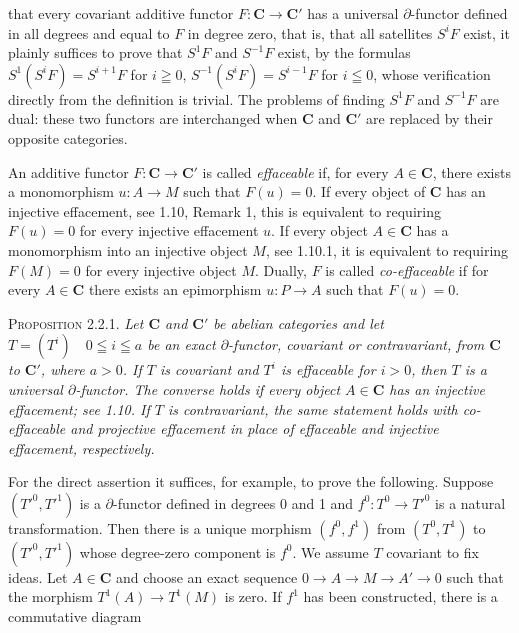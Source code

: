 
\noindent that every covariant additive functor $F:\mathbf{C}\to \mathbf{C}'$ has a
universal $\partial$-functor defined in all degrees and equal to $F$ in degree
zero, that is, that all satellites $S^iF$ exist, it plainly suffices to prove
that $S^1F$ and $S^{-1}F$ exist, by the formulas
$S^1(S^iF)=S^{i+1}F$ for $i\geqq0$, $S^{-1}(S^iF)=S^{i-1}F$ for $i\leqq0$,
whose verification directly from the definition is trivial. The
problems of finding $S^1F$ and $S^{-1}F$ are dual: these two functors are
interchanged when $\mathbf{C}$ and $\mathbf{C}'$ are replaced by their opposite categories.

An additive functor $F:\mathbf{C}\to \mathbf{C}'$ is called \textit{effaceable} if,
for every $A\in \mathbf{C}$, there exists a monomorphism $u:A\to M$ such
that $F(u)=0$. If every object of $\mathbf{C}$ has an injective effacement, see 1.10,
Remark 1, this is equivalent to requiring $F(u)=0$ for every injective
effacement $u$. If every object $A\in \mathbf{C}$ has a monomorphism into an injective
object $M$, see 1.10.1, it is equivalent to requiring $F(M)=0$ for every
injective object $M$. Dually, $F$ is called \textit{co-effaceable} if for
every $A\in \mathbf{C}$ there exists an epimorphism $u:P\to A$ such that
$F(u)=0$.

\indent\textsc{Proposition 2.2.1.} \textit{Let $\mathbf{C}$ and $\mathbf{C}'$ be abelian
categories and let $T=(T^i)\quad 0\leqq i\leqq a$ be an exact
$\partial$-functor, covariant or contravariant, from $\mathbf{C}$ to $\mathbf{C}'$, where
$a>0$. If $T$ is covariant and $T^i$ is effaceable for $i>0$, then $T$ is a
universal $\partial$-functor. The converse holds if every object $A\in \mathbf{C}$ has
an injective effacement; see 1.10. If $T$ is contravariant, the same statement
holds with \textit{co-effaceable} and \textit{projective effacement} in place
of \textit{effaceable} and \textit{injective effacement}, respectively.}

For the direct assertion it suffices, for example, to prove the following.
Suppose $(T'^0,T'^1)$ is a $\partial$-functor defined in degrees 0 and 1 and
$f^0:T^0\to T'^0$ is a natural transformation. Then there is a
unique morphism $(f^0,f^1)$ from $(T^0,T^1)$ to $(T'^0,T'^1)$ whose degree-zero
component is $f^0$. We assume $T$ covariant to fix ideas. Let $A\in \mathbf{C}$ and
choose an exact sequence
$0\to A\to M\to A'\to 0$
such that the morphism $T^1(A)\to T^1(M)$ is zero. If $f^1$ has
been constructed, there is a commutative diagram

